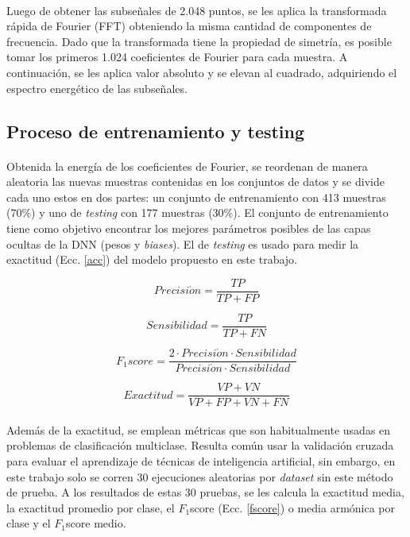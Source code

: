 \documentclass[a4paper,12pt]{article}
\begin{document}
\paragraph{}
Luego de obtener las subseñales de 2.048 puntos, se les aplica la transformada rápida de Fourier (FFT) obteniendo la misma cantidad de componentes de frecuencia. Dado que la transformada tiene la propiedad de simetría, es posible tomar los primeros 1.024 coeficientes de Fourier para cada muestra. A continuación, se les aplica valor absoluto y se elevan al cuadrado, adquiriendo el espectro energético de las subseñales.

\subsection{Proceso de entrenamiento y testing}
\paragraph{}
Obtenida la energía de los coeficientes de Fourier, se reordenan de manera aleatoria las nuevas muestras contenidas en los conjuntos de datos y se divide cada uno estos en dos partes: un conjunto de entrenamiento con 413 muestras (70\%) y uno de \textit{testing} con 177 muestras (30\%). El conjunto de entrenamiento tiene como objetivo encontrar los mejores parámetros posibles de las capas ocultas de la DNN (pesos y \textit{biases}). El de \textit{testing} es usado para medir la exactitud (Ecc. \ref{acc}) del modelo propuesto en este trabajo.

\begin{equation}
\label{precision}
Precisi\acute{o}n = \frac{TP}{TP+FP}
\end{equation}

\begin{equation}
\label{sensibilidad}
Sensibilidad = \frac{TP}{TP+FN}
\end{equation}

\begin{equation}
\label{fscore}
F_{1}score = \frac{2\cdot{Precisi\acute{o}n}\cdot{Sensibilidad}}{Precisi\acute{o}n\cdot{Sensibilidad}}
\end{equation}

\begin{equation}
\label{acc}
Exactitud = \frac{VP+VN}{VP+FP+VN+FN}
\end{equation} 

\paragraph{}
Además de la exactitud, se emplean métricas que son habitualmente usadas en problemas de clasificación multiclase. Resulta común usar la validación cruzada para evaluar el aprendizaje de técnicas de inteligencia artificial, sin embargo, en este trabajo solo se corren 30 ejecuciones aleatorias por \textit{dataset} sin este método de prueba. A los resultados de estas 30 pruebas, se les calcula la exactitud media, la exactitud promedio por clase, el $F_{1}$score (Ecc. \ref{fscore}) o media armónica por clase y el $F_{1}$score medio.
\end{document}
